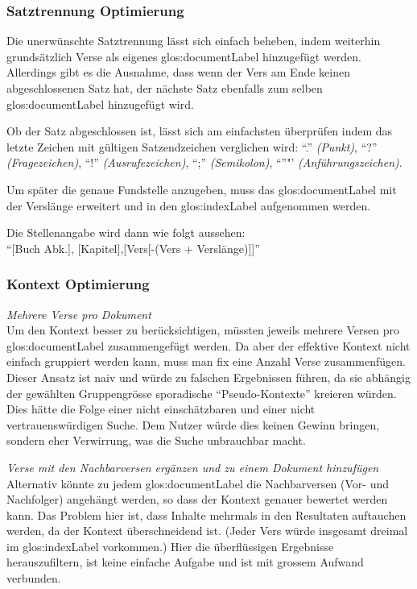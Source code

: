 \subsubsection{Satztrennung Optimierung}
Die unerwünschte Satztrennung lässt sich einfach beheben, indem weiterhin grundsätzlich Verse als eigenes \gls{glos:documentLabel} hinzugefügt werden.
Allerdings gibt es die Ausnahme, dass wenn der Vers am Ende keinen abgeschlossenen Satz hat, der nächste Satz ebenfalls zum selben \gls{glos:documentLabel} hinzugefügt wird.

Ob der Satz abgeschlossen ist, lässt sich am einfachsten überprüfen indem das letzte Zeichen mit gültigen Satzendzeichen verglichen wird:
"`."' \textit{(Punkt)},
"`?"' \textit{(Fragezeichen)},
"`!"' \textit{(Ausrufezeichen)},
"`;"' \textit{(Semikolon)},
"`"'"' \textit{(Anführungszeichen)}.

Um später die genaue Fundstelle anzugeben, muss das \gls{glos:documentLabel} mit der Verslänge erweitert und in den \gls{glos:indexLabel} aufgenommen werden.

Die Stellenangabe wird dann wie folgt aussehen:\\
"`[Buch Abk.], [Kapitel],[Vers[-(Vers + Verslänge)]]"'

\subsubsection{Kontext Optimierung}
\label{sec:contextOptimaze}
\textit{Mehrere Verse pro Dokument}
\vspace{0.5em}\\
Um den Kontext besser zu berücksichtigen, müssten jeweils mehrere Versen pro \gls{glos:documentLabel} zusammengefügt werden.
Da aber der effektive Kontext nicht einfach gruppiert werden kann, muss man fix eine Anzahl Verse zusammenfügen.
Dieser Ansatz ist naiv und würde zu falschen Ergebnissen führen, da sie abhängig der gewählten Gruppengrösse sporadische "`Pseudo-Kontexte"' kreieren würden.
Dies hätte die Folge einer nicht einschätzbaren und einer nicht vertrauenswürdigen Suche.
Dem Nutzer würde dies keinen Gewinn bringen, sondern eher Verwirrung, was die Suche unbrauchbar macht.

\vspace{0.5em}
\textit{Verse mit den Nachbarversen ergänzen und zu einem Dokument hinzufügen}
\vspace{0.5em}\\
Alternativ könnte zu jedem \gls{glos:documentLabel} die Nachbarversen (Vor- und Nachfolger) angehängt werden, so dass der Kontext genauer bewertet werden kann.
Das Problem hier ist, dass Inhalte mehrmals in den Resultaten auftauchen werden, da der Kontext überschneidend ist. (Jeder Vers würde insgesamt dreimal im \gls{glos:indexLabel} vorkommen.)
Hier die überflüssigen Ergebnisse herauszufiltern, ist keine einfache Aufgabe und ist mit grossem Aufwand verbunden.

